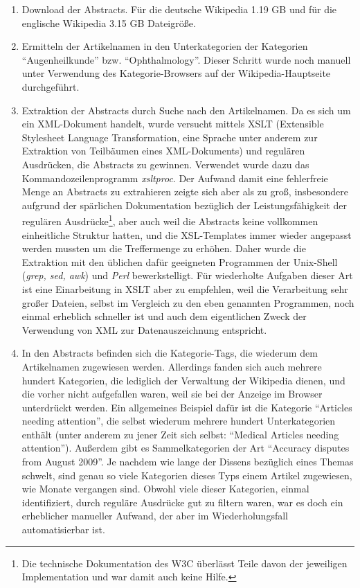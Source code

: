 \documentclass[pagesize,paper=A4,DIV=calc,fontsize=12pt,draft=false]{scrreprt}
\begin{document}
\begin{enumerate}
\item Download der Abstracts. Für die deutsche Wikipedia 1.19 GB und für die englische Wikipedia 3.15 GB Dateigröße.

\item Ermitteln der Artikelnamen in den Unterkategorien der Kategorien \enquote{Augenheilkunde} bzw. \enquote{Ophthalmology}. 
Dieser Schritt wurde noch manuell unter Verwendung des Kategorie-Browsers auf der Wikipedia-Hauptseite durchgeführt. 

\item Extraktion der Abstracts durch Suche nach den Artikelnamen. 
Da es sich um ein XML-Dokument handelt, wurde versucht mittels XSLT (Extensible Stylesheet Language Transformation, eine Sprache unter anderem zur Extraktion von Teilbäumen eines XML-Dokuments) und regulären Ausdrücken, die Abstracts zu gewinnen. 
Verwendet wurde dazu das Kommandozeilenprogramm \emph{xsltproc}. 
Der Aufwand damit eine fehlerfreie Menge an Abstracts zu extrahieren zeigte sich aber als zu groß, insbesondere aufgrund der spärlichen Dokumentation bezüglich der Leistungsfähigkeit der regulären Ausdrücke\footnote{Die technische Dokumentation des W3C überlässt Teile davon der jeweiligen Implementation und war damit auch keine Hilfe.}, aber auch weil die Abstracts keine vollkommen einheitliche Struktur hatten, und die XSL-Templates immer wieder angepasst werden mussten um die Treffermenge zu erhöhen. 
Daher wurde die Extraktion mit den üblichen dafür geeigneten Programmen der Unix-Shell (\emph{grep, sed, awk}) und \emph{Perl} bewerkstelligt. 
Für wiederholte Aufgaben dieser Art ist eine Einarbeitung in XSLT aber zu empfehlen, weil die Verarbeitung sehr großer Dateien, selbst im Vergleich zu den eben genannten Programmen, noch einmal erheblich schneller ist und auch dem eigentlichen Zweck der Verwendung von XML zur Datenauszeichnung entspricht. 

\item In den Abstracts befinden sich die Kategorie-Tags, die wiederum dem Artikelnamen zugewiesen werden. 
Allerdings fanden sich auch mehrere hundert Kategorien, die lediglich der Verwaltung der Wikipedia dienen, und die vorher nicht aufgefallen waren, weil sie bei der Anzeige im Browser unterdrückt werden. 
Ein allgemeines Beispiel dafür ist die Kategorie \enquote{Articles needing attention}, die selbst wiederum mehrere hundert Unterkategorien enthält (unter anderem zu jener Zeit sich selbst: \enquote{Medical Articles needing attention}). 
Außerdem gibt es Sammelkategorien der Art \enquote{Accuracy disputes from August 2009}. 
Je nachdem wie lange der Dissens bezüglich eines Themas schwelt, sind genau so viele Kategorien dieses Typs einem Artikel zugewiesen, wie Monate vergangen sind. 
Obwohl viele dieser Kategorien, einmal identifiziert, durch reguläre Ausdrücke gut zu filtern waren, war es doch ein erheblicher manueller Aufwand, der aber im Wiederholungsfall automatisierbar ist.
\end{enumerate}
\end{document}
